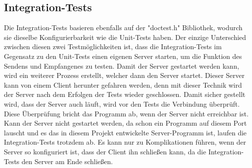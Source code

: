 \subsection{Integration-Tests}
Die Integration-Tests basieren ebenfalls auf der "doctest.h" Bibliothek, wodurch sie dieselbe Konfigurierbarkeit wie die Unit-Tests haben. Der einzige Unterschied zwischen diesen zwei Testmöglichkeiten ist, dass die Integration-Tests im Gegensatz zu den Unit-Tests einen eigenen Server starten, um die Funktion des Sendens und Empfangenes zu testen. Damit der Server gestartet werden kann, wird ein weiterer Prozess erstellt, welcher dann den Server startet. Dieser Server kann von einem Client herunter gefahren werden, denn mit dieser Technik wird der Server nach dem Erfolgen der Tests wieder geschlossen. Damit sicher gestellt wird, dass der Server auch läuft, wird vor den Tests die Verbindung überprüft. Diese Überprüfung bricht das Programm ab, wenn der Server nicht erreichbar ist. Kann der Server nicht gestartet werden, da schon ein Programm auf diesem Port lauscht und es das in diesem Projekt entwickelte Server-Programm ist, laufen die Integration-Tests trotzdem ab. Es kann nur zu Komplikationen führen, wenn der Server so konfiguriert ist, dass der Client ihn schließen kann, da die Integration-Tests den Server am Ende schließen.